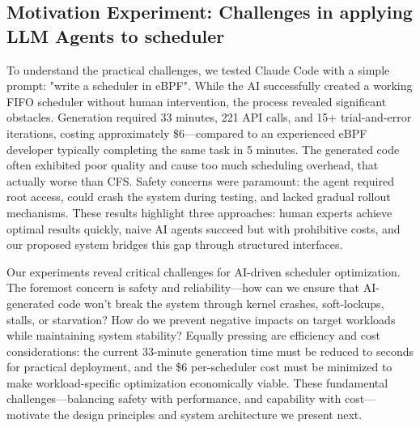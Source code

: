 \subsection{Motivation Experiment: Challenges in applying LLM Agents to scheduler}

To understand the practical challenges, we tested Claude Code with a simple prompt: "write a scheduler in eBPF". While the AI successfully created a working FIFO scheduler without human intervention, the process revealed significant obstacles. Generation required 33 minutes, 221 API calls, and 15+ trial-and-error iterations, costing approximately \$6—compared to an experienced eBPF developer typically completing the same task in 5 minutes. The generated code often exhibited poor quality and cause too much scheduling overhead, that actually worse than CFS. Safety concerns were paramount: the agent required root access, could crash the system during testing, and lacked gradual rollout mechanisms. These results highlight three approaches: human experts achieve optimal results quickly, naive AI agents succeed but with prohibitive costs, and our proposed system bridges this gap through structured interfaces.

Our experiments reveal critical challenges for AI-driven scheduler optimization. The foremost concern is safety and reliability—how can we ensure that AI-generated code won't break the system through kernel crashes, soft-lockups, stalls, or starvation? How do we prevent negative impacts on target workloads while maintaining system stability? Equally pressing are efficiency and cost considerations: the current 33-minute generation time must be reduced to seconds for practical deployment, and the \$6 per-scheduler cost must be minimized to make workload-specific optimization economically viable. These fundamental challenges—balancing safety with performance, and capability with cost—motivate the design principles and system architecture we present next.